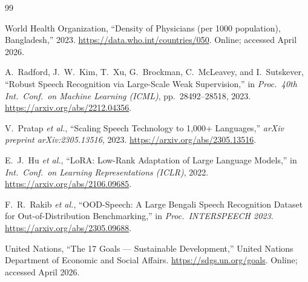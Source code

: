 \documentclass[12pt,a4paper]{article}
\begin{document}
\begin{thebibliography}{99}

World Health Organization,
``Density of Physicians (per 1000 population), Bangladesh,'' 2023.
\url{https://data.who.int/countries/050}.
Online; accessed April 2026.

A.~Radford, J.~W.~Kim, T.~Xu, G.~Brockman, C.~McLeavey,
and I.~Sutskever,
``Robust Speech Recognition via Large-Scale Weak Supervision,''
in \emph{Proc.\ 40th Int.\ Conf.\ on Machine Learning (ICML)},
pp.~28492--28518, 2023.
\url{https://arxiv.org/abs/2212.04356}.

V.~Pratap \emph{et al.},
``Scaling Speech Technology to 1{,}000+ Languages,''
\emph{arXiv preprint arXiv:2305.13516}, 2023.
\url{https://arxiv.org/abs/2305.13516}.

E.~J.~Hu \emph{et al.},
``LoRA: Low-Rank Adaptation of Large Language Models,''
in \emph{Int.\ Conf.\ on Learning Representations (ICLR)}, 2022.
\url{https://arxiv.org/abs/2106.09685}.

F.~R.~Rakib \emph{et al.},
``OOD-Speech: A Large Bengali Speech Recognition Dataset for
Out-of-Distribution Benchmarking,''
in \emph{Proc.\ INTERSPEECH 2023}.
\url{https://arxiv.org/abs/2305.09688}.

United Nations,
``The 17 Goals --- Sustainable Development,''
United Nations Department of Economic and Social Affairs.
\url{https://sdgs.un.org/goals}.
Online; accessed April 2026.

\end{thebibliography}
\end{document}

